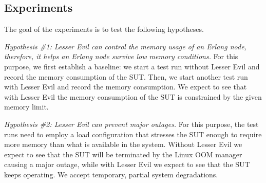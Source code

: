 \documentclass{llncs}
\begin{document}
%
%
%

\subsection{Experiments}
The goal of the experiments is to test the following hypotheses. 

\emph{Hypothesis \#1: Lesser Evil can control the memory usage of an Erlang node, therefore, it helps an Erlang node survive low memory conditions.} For this purpose, we first  establish a baseline: we start a test run without Lesser Evil and record the memory consumption of the SUT. Then, we start another test run with Lesser Evil and record the memory consumption. We expect to see that with Lesser Evil the memory consumption of the SUT is constrained by the given memory limit.

\emph{Hypothesis \#2: Lesser Evil can prevent major outages.}  For this purpose, the test runs need to employ a load configuration that stresses the SUT enough to require more memory than what is available in the system. Without Lesser Evil we expect to see that the SUT will be terminated by the Linux OOM manager causing a major outage, while with Lesser Evil we expect to see that the SUT keeps operating. We accept temporary, partial system degradations.
\end{document}
